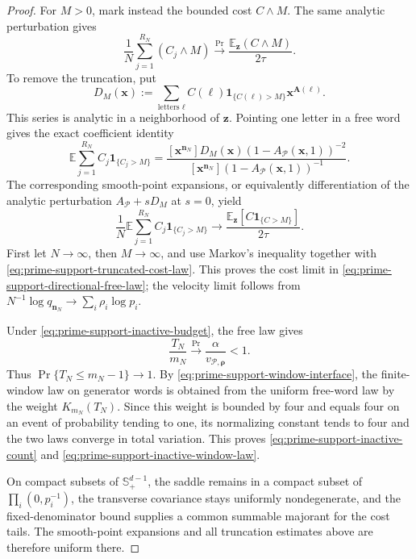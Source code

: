 \begin{proof}
For \(M>0\), mark instead the bounded cost \(C\wedge M\).  The same analytic
perturbation gives
\begin{equation}
 \frac1N\sum_{j=1}^{R_N}(C_j\wedge M)
 \xrightarrow{\Pr}\frac{\mathbb E_{\mathbf z}(C\wedge M)}{2\tau}.
 \label{eq:prime-support-truncated-cost-law}
\end{equation}
To remove the truncation, put
\[
 D_M(\mathbf x):=
 \sum_{\text{letters }\ell}C(\ell)\mathbf1_{\{C(\ell)>M\}}
 \mathbf x^{\mathbf A(\ell)}.
\]
This series is analytic in a neighborhood of \(\mathbf z\).  Pointing one
letter in a free word gives the exact coefficient identity
\[
 \mathbb E\sum_{j=1}^{R_N}C_j\mathbf1_{\{C_j>M\}}
 =\frac{[\mathbf x^{\mathbf n_N}]
  D_M(\mathbf x)(1-A_{\mathcal P}(\mathbf x,1))^{-2}}
 {[\mathbf x^{\mathbf n_N}]
  (1-A_{\mathcal P}(\mathbf x,1))^{-1}}.
\]
The corresponding smooth-point expansions, or equivalently differentiation
of the analytic perturbation
\(A_{\mathcal P}+sD_M\) at \(s=0\), yield
\[
 \frac1N\mathbb E\sum_{j=1}^{R_N}
 C_j\mathbf1_{\{C_j>M\}}
 \longrightarrow
 \frac{\mathbb E_{\mathbf z}[C\mathbf1_{\{C>M\}}]}{2\tau}.
\]
First let \(N\to\infty\), then \(M\to\infty\), and use Markov's
inequality together with \eqref{eq:prime-support-truncated-cost-law}.  This
proves the cost limit in \eqref{eq:prime-support-directional-free-law}; the
velocity limit follows from
\(N^{-1}\log q_{\mathbf n_N}\to\sum_i\rho_i\log p_i\).

Under \eqref{eq:prime-support-inactive-budget}, the free law gives
\[
 \frac{T_N}{m_N}\xrightarrow{\Pr}
 \frac{\alpha}{v_{\mathcal P,\boldsymbol\rho}}<1.
\]
Thus \(\Pr\{T_N\le m_N-1\}\to1\).  By
\eqref{eq:prime-support-window-interface}, the finite-window law on generator
words is obtained from the uniform free-word law by the weight
\(K_{m_N}(T_N)\).  Since this weight is bounded by four and equals four on
an event of probability tending to one, its normalizing constant tends to
four and the two laws converge in total variation.  This proves
\eqref{eq:prime-support-inactive-count} and
\eqref{eq:prime-support-inactive-window-law}.

On compact subsets of \(\mathbb S_{+}^{d-1}\), the saddle remains in a
compact subset of \(\prod_i(0,p_i^{-1})\), the transverse covariance stays
uniformly nondegenerate, and the fixed-denominator bound supplies a common
summable majorant for the cost tails.  The smooth-point expansions and all
truncation estimates above are therefore uniform there.
\end{proof}

